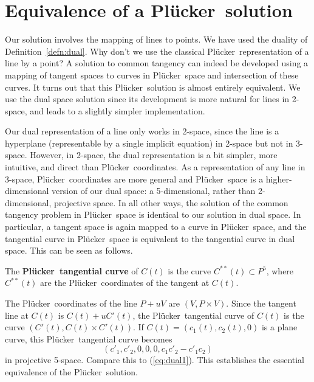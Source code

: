 \documentclass[10pt,twocolumn]{article}
\newif\ifJournal
\newcommand{\plucker}{Pl\"{u}cker\ }
\begin{document}
\ifJournal
Comparison with Zorin:
different treatment of points at infinity: 2 clipped curves, not hypercube;
we work with Bezier curves rather than subdivision surfaces
devil is in the details since idea of mapping to dual space is not new anyway
\fi

\section{Equivalence of a \plucker solution}
\label{sec:plucker}

Our solution involves the mapping of lines to points.
We have used the duality of Definition~\ref{defn:dual}.
Why don't we use the classical \plucker representation of a line by a point?
A solution to common tangency can indeed be developed using a mapping of 
tangent spaces to curves in \plucker space and intersection of these curves.
It turns out that this \plucker solution is almost entirely equivalent.
We use the dual space solution since its development is more natural
for lines in 2-space, and leads to a slightly simpler implementation.

Our dual representation of a line only works in 2-space,
since the line is a hyperplane (representable by a single implicit equation)
in 2-space but not in 3-space.
However, in 2-space, 
the dual representation is a bit simpler, more intuitive, and direct than \plucker coordinates.
As a representation of any line in 3-space, \plucker coordinates are more general
and \plucker space is a higher-dimensional version of our dual space:
a 5-dimensional, rather than 2-dimensional, projective space.
In all other ways, the solution of the common tangency problem in \plucker space 
is identical to our solution in dual space.
In particular, a tangent space is again mapped to a curve in \plucker space, 
and the tangential curve in \plucker space is equivalent to the tangential curve
in dual space.
This can be seen as follows.

\begin{defn2}
The {\bf \plucker tangential curve} of $C(t)$ is the curve $C^{**}(t) \subset P^5$,
where $C^{**}(t)$ are the \plucker coordinates of the tangent at $C(t)$.
\end{defn2}

The \plucker coordinates of the line $P+uV$ are $(V,P \times V)$.
Since the tangent line at $C(t)$ is $C(t) + uC'(t)$,
the \plucker tangential curve of $C(t)$
is the curve $(C'(t), C(t) \times C'(t))$.
If $C(t) = (c_1(t),c_2(t),0)$ is a plane curve,
this \plucker tangential curve becomes
\begin{equation}
\label{eqn:plucker}
	(c'_1, c'_2, 0, 0, 0, c_1c'_2 - c'_1c_2)
\end{equation}
in projective 5-space.
Compare this to (\ref{eq:dual1}).
This establishes the essential equivalence of the \plucker solution.
\end{document}
